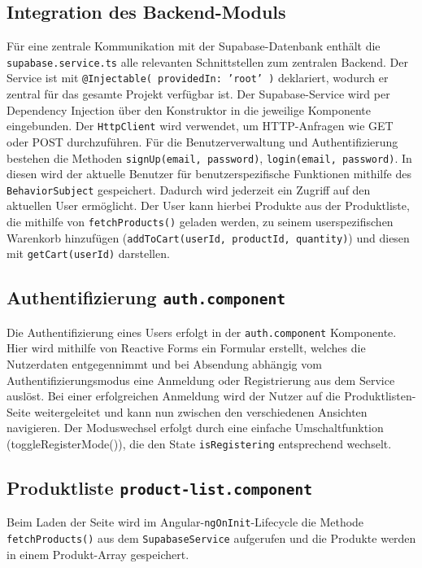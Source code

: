\documentclass[oneside]{ausarbeitung}
\begin{document}
\subsection{Integration des Backend-Moduls}

Für eine zentrale Kommunikation mit der Supabase-Datenbank enthält die \texttt{supabase.service.ts} alle relevanten Schnittstellen zum zentralen Backend.
Der Service ist mit \texttt{@Injectable({ providedIn: 'root' })} deklariert, wodurch er zentral für das gesamte Projekt verfügbar ist. Der Supabase-Service wird per Dependency Injection über den Konstruktor in die jeweilige Komponente eingebunden. Der \texttt{HttpClient} wird verwendet, um HTTP-Anfragen wie GET oder POST durchzuführen. Für die Benutzerverwaltung und Authentifizierung bestehen die Methoden \texttt{signUp(email, password)}, \texttt{login(email, password)}. In diesen wird der aktuelle Benutzer für benutzerspezifische Funktionen mithilfe des \texttt{BehaviorSubject} gespeichert. Dadurch wird jederzeit ein Zugriff auf den aktuellen User ermöglicht. Der User kann hierbei Produkte aus der Produktliste, die mithilfe von \texttt{fetchProducts()} geladen werden, zu seinem userspezifischen Warenkorb hinzufügen (\texttt{addToCart(userId, productId, quantity)}) und diesen mit \texttt{getCart(userId)} darstellen.

\subsection{Authentifizierung \texttt{auth.component}}

Die Authentifizierung eines Users erfolgt in der \texttt{auth.component} Komponente. Hier wird mithilfe von Reactive Forms ein Formular erstellt, welches die Nutzerdaten entgegennimmt und bei Absendung abhängig vom Authentifizierungsmodus eine Anmeldung oder Registrierung aus dem Service auslöst. Bei einer erfolgreichen Anmeldung wird der Nutzer auf die Produktlisten-Seite weitergeleitet und kann nun zwischen den verschiedenen Ansichten navigieren. Der Moduswechsel erfolgt durch eine einfache Umschaltfunktion (toggleRegisterMode()), die den State \texttt{isRegistering} entsprechend wechselt.

\subsection{Produktliste \texttt{product-list.component}}

Beim Laden der Seite wird im Angular-\texttt{ngOnInit}-Lifecycle die Methode \texttt{fetchProducts()} aus dem \texttt{SupabaseService} aufgerufen und die Produkte werden in einem Produkt-Array gespeichert.
\end{document}
